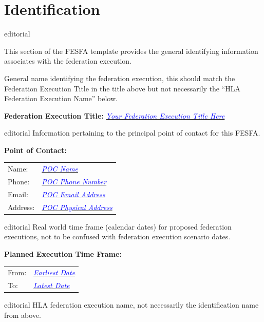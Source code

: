 \documentclass[11pt,english,letterpaper]{article}
\newcommand{\example}[1]{{\textcolor{blue}{\textit{#1}}}}
\begin{document}
\section*{Identification}

\begin{shownto}{editorial}
{\color{red} This section of the FESFA template provides the general
identifying information associates with the federation execution.

General name identifying the federation execution, this should match the
\textlangle{}Federation Execution Title\textrangle{} in the title above but not
necessarily the “HLA Federation Execution Name” below.}
\end{shownto}

\textbf{Federation Execution Title: } \underline{\example{Your Federation Execution Title Here}}

\begin{shownto}{editorial}
{\color{red} Information pertaining to the principal point of contact for this FESFA.}
\end{shownto}

\textbf{Point of Contact: }

\hspace{0.25in}
\begin{tabularx}{\textwidth}{lX}
Name:    & \underline{\example{POC Name}} \\
Phone:   & \underline{\example{POC Phone Number}} \\
Email:   & \underline{\example{POC Email Address}} \\
Address: & \underline{\example{POC Physical Address}}
\end{tabularx}

\begin{shownto}{editorial}
{\color{red} Real world time frame (calendar dates) for proposed federation
executions, not to be confused with federation execution scenario dates.}
\end{shownto}

\textbf{Planned Execution Time Frame: }

\hspace{0.25in}
\begin{tabular}{ll}
From: & \underline{\example{Earliest Date}} \\
To:   & \underline{\example{Latest Date}}
\end{tabular}

\begin{shownto}{editorial}
{\color{red} HLA federation execution name, not necessarily the identification
name from above.}
\end{shownto}
\end{document}
